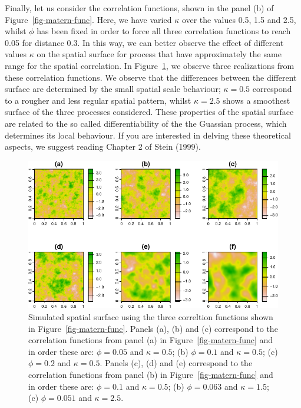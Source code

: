 \documentclass[
  letterpaper,
]{krantz}
\begin{document}
Finally, let us consider the correlation functions, shown in the panel
(b) of Figure~\ref{fig-matern-func}. Here, we have varied \(\kappa\)
over the values 0.5, 1.5 and 2.5, whilst \(\phi\) has been fixed in
order to force all three correlation functions to reach 0.05 for
distance 0.3. In this way, we can better observe the effect of different
values \(\kappa\) on the spatial surface for process that have
approximately the same range for the spatial correlation. In
Figure~\ref{fig-matern-sim}, we observe three realizations from these
correlation functions. We observe that the differences between the
different surface are determined by the small spatial scale behaviour;
\(\kappa = 0.5\) correspond to a rougher and less regular spatial
pattern, whilst \(\kappa=2.5\) shows a smoothest surface of the three
processes considered. These properties of the spatial surface are
related to the so called differentiability of the the Guassian process,
which determines its local behaviour. If you are interested in delving
these theoretical aspects, we suggest reading Chapter 2 of Stein (1999).

\begin{figure}

{\centering \includegraphics{01_intro_files/figure-pdf/fig-matern-sim-1.pdf}

}

\caption{\label{fig-matern-sim}Simulated spatial surface using the three
correltion functions shown in Figure~\ref{fig-matern-func}. Panels (a),
(b) and (c) correspond to the correlation functions from panel (a) in
Figure~\ref{fig-matern-func} and in order these are: \(\phi = 0.05\) and
\(\kappa=0.5\); (b) \(\phi=0.1\) and \(\kappa=0.5\); (c) \(\phi=0.2\)
and \(\kappa=0.5\). Panels (c), (d) and (e) correspond to the
correlation functions from panel (b) in Figure~\ref{fig-matern-func} and
in order these are: \(\phi = 0.1\) and \(\kappa=0.5\); (b)
\(\phi=0.063\) and \(\kappa=1.5\); (c) \(\phi=0.051\) and
\(\kappa=2.5\).}

\end{figure}
\end{document}
